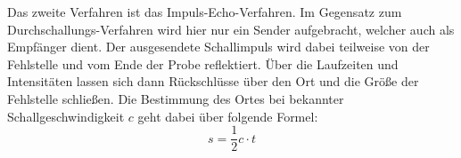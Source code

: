 \noindent 
Das zweite Verfahren ist das Impuls-Echo-Verfahren. 
Im Gegensatz zum Durchschallungs-Verfahren wird hier nur ein Sender aufgebracht, welcher auch als Empfänger dient.
Der ausgesendete Schallimpuls wird dabei teilweise von der Fehlstelle und vom Ende der Probe reflektiert. 
Über die Laufzeiten und Intensitäten lassen sich dann Rückschlüsse über den Ort und die Größe der Fehlstelle schließen.
Die Bestimmung des Ortes bei bekannter Schallgeschwindigkeit $c$ geht dabei über folgende Formel:
\begin{equation*}
    s=\frac{1}{2}c \cdot t
\end{equation*}
